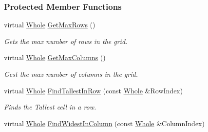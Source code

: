 \subsubsection*{Protected Member Functions}
\begin{DoxyCompactItemize}
\item 
\hypertarget{classphys_1_1UI_1_1CellGrid_ab031e5d26dcb8b2617533e284816b5ed}{
virtual \hyperlink{namespacephys_a460f6bc24c8dd347b05e0366ae34f34a}{Whole} \hyperlink{classphys_1_1UI_1_1CellGrid_ab031e5d26dcb8b2617533e284816b5ed}{GetMaxRows} ()}
\label{classphys_1_1UI_1_1CellGrid_ab031e5d26dcb8b2617533e284816b5ed}

\begin{DoxyCompactList}\small\item\em Gets the max number of rows in the grid. \item\end{DoxyCompactList}\item 
\hypertarget{classphys_1_1UI_1_1CellGrid_ac7338fc2ba7cc9575c9f47d70d998574}{
virtual \hyperlink{namespacephys_a460f6bc24c8dd347b05e0366ae34f34a}{Whole} \hyperlink{classphys_1_1UI_1_1CellGrid_ac7338fc2ba7cc9575c9f47d70d998574}{GetMaxColumns} ()}
\label{classphys_1_1UI_1_1CellGrid_ac7338fc2ba7cc9575c9f47d70d998574}

\begin{DoxyCompactList}\small\item\em Gest the max number of columns in the grid. \item\end{DoxyCompactList}\item 
\hypertarget{classphys_1_1UI_1_1CellGrid_ae2970e94e9f4e79520ff93bb0c3238b0}{
virtual \hyperlink{namespacephys_a460f6bc24c8dd347b05e0366ae34f34a}{Whole} \hyperlink{classphys_1_1UI_1_1CellGrid_ae2970e94e9f4e79520ff93bb0c3238b0}{FindTallestInRow} (const \hyperlink{namespacephys_a460f6bc24c8dd347b05e0366ae34f34a}{Whole} \&RowIndex)}
\label{classphys_1_1UI_1_1CellGrid_ae2970e94e9f4e79520ff93bb0c3238b0}

\begin{DoxyCompactList}\small\item\em Finds the Tallest cell in a row. \item\end{DoxyCompactList}\item 
\hypertarget{classphys_1_1UI_1_1CellGrid_af659299b53bb143d6593c6ac84ef45a3}{
virtual \hyperlink{namespacephys_a460f6bc24c8dd347b05e0366ae34f34a}{Whole} \hyperlink{classphys_1_1UI_1_1CellGrid_af659299b53bb143d6593c6ac84ef45a3}{FindWidestInColumn} (const \hyperlink{namespacephys_a460f6bc24c8dd347b05e0366ae34f34a}{Whole} \&ColumnIndex)}
\label{classphys_1_1UI_1_1CellGrid_af659299b53bb143d6593c6ac84ef45a3}


\end{DoxyCompactItemize}
